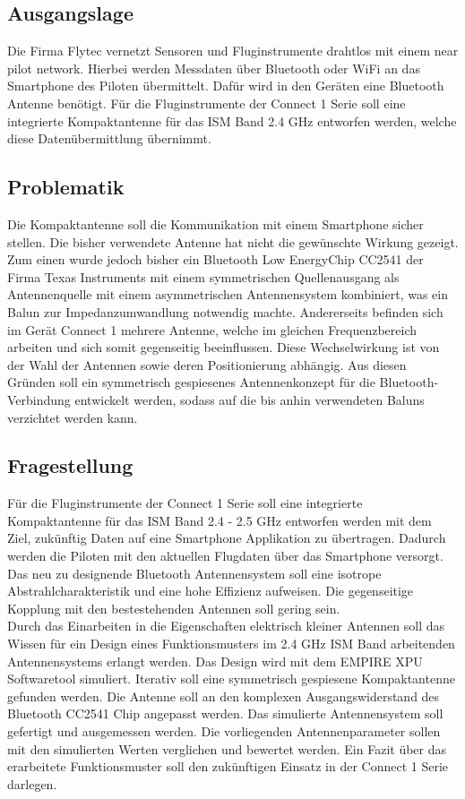 \subsection{Ausgangslage}
Die Firma Flytec vernetzt Sensoren und Fluginstrumente drahtlos mit einem  \glqq near pilot network\grqq. Hierbei werden Messdaten über Bluetooth oder WiFi an das Smartphone des Piloten übermittelt. Dafür wird in den Geräten eine Bluetooth Antenne benötigt. Für die Fluginstrumente der \glqq Connect 1 \grqq Serie  soll eine integrierte Kompaktantenne für das ISM Band 2.4 GHz entworfen werden, welche diese Datenübermittlung übernimmt. 

\subsection{Problematik}
Die Kompaktantenne soll die Kommunikation mit einem Smartphone sicher stellen. Die bisher verwendete Antenne hat nicht die gewünschte Wirkung gezeigt. Zum einen wurde jedoch bisher ein \glqq Bluetooth Low Energy\grqq Chip CC2541 der Firma Texas Instruments mit einem symmetrischen Quellenausgang als Antennenquelle mit einem asymmetrischen  Antennensystem kombiniert, was  ein Balun zur Impedanzumwandlung notwendig machte. Andererseits befinden sich im Gerät \glqq Connect 1 \grqq mehrere Antenne, welche im gleichen Frequenzbereich arbeiten und sich somit gegenseitig beeinflussen. Diese Wechselwirkung ist von der Wahl der Antennen sowie deren Positionierung abhängig. Aus diesen Gründen soll ein symmetrisch gespiesenes Antennenkonzept für die Bluetooth-Verbindung entwickelt werden, sodass auf die bis anhin verwendeten Baluns verzichtet werden kann.
\subsection{Fragestellung}
Für die Fluginstrumente der \glqq Connect 1 \grqq Serie  soll eine integrierte Kompaktantenne für das ISM Band 2.4 - 2.5 GHz entworfen werden mit dem Ziel, zukünftig Daten auf eine Smartphone Applikation zu übertragen. Dadurch werden die Piloten mit den aktuellen Flugdaten über das Smartphone  versorgt. Das neu zu designende Bluetooth Antennensystem soll eine isotrope Abstrahlcharakteristik und eine
 hohe Effizienz aufweisen. Die gegenseitige Kopplung mit den bestestehenden Antennen soll gering sein. \\


Durch das Einarbeiten in die Eigenschaften elektrisch kleiner Antennen soll das Wissen für ein Design eines Funktionsmusters  im 2.4 GHz ISM Band arbeitenden Antennensystems erlangt werden. Das Design wird mit dem EMPIRE XPU Softwaretool simuliert. Iterativ soll eine symmetrisch gespiesene Kompaktantenne gefunden werden. Die Antenne soll an den komplexen Ausgangswiderstand des Bluetooth CC2541 Chip angepasst werden. Das simulierte Antennensystem soll gefertigt und ausgemessen werden. Die vorliegenden Antennenparameter sollen mit den simulierten Werten verglichen und bewertet werden. Ein Fazit über das erarbeitete Funktionsmuster soll den zukünftigen Einsatz in der \glqq Connect 1 \grqq Serie darlegen.
